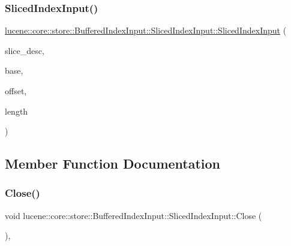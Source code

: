 \subsubsection{\texorpdfstring{Sliced\+Index\+Input()}{SlicedIndexInput()}}
{\footnotesize\ttfamily \mbox{\hyperlink{classlucene_1_1core_1_1store_1_1BufferedIndexInput_1_1SlicedIndexInput}{lucene\+::core\+::store\+::\+Buffered\+Index\+Input\+::\+Sliced\+Index\+Input\+::\+Sliced\+Index\+Input}} (\begin{DoxyParamCaption}\item[{\mbox{\hyperlink{ZlibCrc32_8h_a2c212835823e3c54a8ab6d95c652660e}{const}} std\+::string \&}]{slice\+\_\+desc,  }\item[{\mbox{\hyperlink{classlucene_1_1core_1_1store_1_1IndexInput}{Index\+Input}} $\ast$}]{base,  }\item[{\mbox{\hyperlink{ZlibCrc32_8h_a2c212835823e3c54a8ab6d95c652660e}{const}} uint64\+\_\+t}]{offset,  }\item[{\mbox{\hyperlink{ZlibCrc32_8h_a2c212835823e3c54a8ab6d95c652660e}{const}} uint64\+\_\+t}]{length }\end{DoxyParamCaption})\hspace{0.3cm}{\ttfamily [inline]}}



\subsection{Member Function Documentation}
\mbox{\label{classlucene_1_1core_1_1store_1_1BufferedIndexInput_1_1SlicedIndexInput_abb75cb398fdd503e67eeca9c057cc604}} 
\subsubsection{\texorpdfstring{Close()}{Close()}}
{\footnotesize\ttfamily void lucene\+::core\+::store\+::\+Buffered\+Index\+Input\+::\+Sliced\+Index\+Input\+::\+Close (\begin{DoxyParamCaption}{ }\end{DoxyParamCaption})\hspace{0.3cm}{\ttfamily [inline]}, {\ttfamily [virtual]}}



